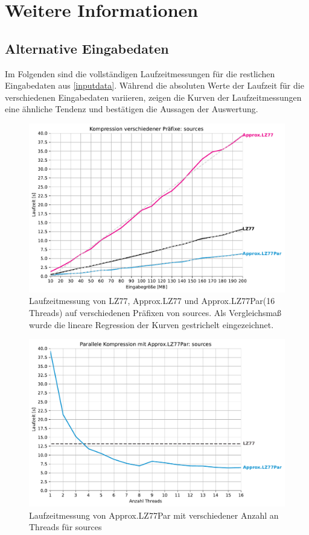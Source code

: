 \chapter{Weitere Informationen}
\section{Alternative Eingabedaten} \label{alternative}
Im Folgenden sind die vollständigen Laufzeitmessungen für die restlichen Eingabedaten aus \ref{inputdata}. Während die absoluten Werte
der Laufzeit für die verschiedenen Eingabedaten variieren, zeigen die Kurven der Laufzeitmessungen eine ähnliche Tendenz und bestätigen die
Aussagen der Auswertung.
\begin{figure} [H]
    \centering
    \caption{Laufzeitmessung von LZ77, Approx.LZ77 und Approx.LZ77Par(16 Threads) auf verschiedenen Präfixen von sources. Als Vergleichsmaß wurde 
    die lineare Regression der Kurven gestrichelt eingezeichnet.}
    \includegraphics[scale=0.71]{Images/progressive_sources.pdf}
\end{figure}

\begin{figure}[H]
    \centering
    \caption{Laufzeitmessung von Approx.LZ77Par mit verschiedener Anzahl an Threads für sources}
    \includegraphics[scale=0.68]{Images/progressive_speedup_sources.pdf}
\end{figure}

